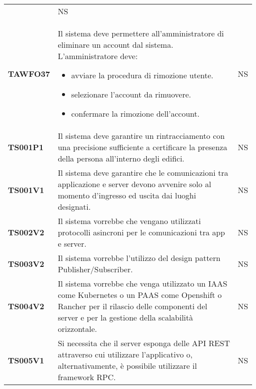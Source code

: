 \documentclass[../piano-di-qualifica.tex]{subfiles}
\begin{document}
\begin{centering}
\begin{longtable}[H]{>{\centering\bfseries}m{3cm} >{}p{10cm} >{\centering\arraybackslash}m{3cm}}
\begin{itemize}
                        \end{itemize}
                      & NS \\
        TAWFO37       & Il sistema deve permettere all'amministratore di eliminare un account dal sistema. \newline
                        L'amministratore deve:
                        \begin{itemize}
                          \item avviare la procedura di rimozione utente.
                          \item selezionare l'account da rimuovere.
                          \item confermare la rimozione dell'account.
                        \end{itemize}
                      & NS \\


        TS001P1 & Il sistema deve garantire un rintracciamento con una precisione sufficiente a certificare la presenza della persona all’interno degli edifici. \newline
                & NS \\

        TS001V1 & Il sistema deve garantire che le comunicazioni tra applicazione e server devono avvenire solo al momento d’ingresso ed uscita dai luoghi designati. \newline
                & NS \\

        TS002V2 & Il sistema vorrebbe che vengano utilizzati protocolli asincroni per le comunicazioni tra app e server. \newline
                & NS \\

        TS003V2 & Il sistema vorrebbe l’utilizzo del design pattern Publisher/Subscriber. \newline
                & NS \\

        TS004V2 & Il sistema vorrebbe che venga utilizzato un IAAS come Kubernetes o un PAAS come Openshift o Rancher per il rilascio delle componenti del server e per la gestione della scalabilità orizzontale. \newline
                & NS \\

        TS005V1 & Si necessita che il server esponga delle API REST attraverso cui utilizzare l’applicativo o, alternativamente, è possibile utilizzare il framework RPC\@. \newline
                & NS \\


\end{longtable}
\end{centering}
\end{document}
